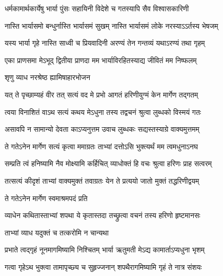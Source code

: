 \twolineshloka
{धर्मकामार्थकार्येषु भार्या पुंसः सहायिनी}
{विदेशे च गतस्यापि सैव विश्वासकारिणी}%

\twolineshloka
{नास्ति भार्यासमो बन्धुर्नास्ति भार्यासमं सुखम्}
{नास्ति भार्यासमं लोके नरस्याऽऽर्तस्य भेषजम्}%

\twolineshloka
{यस्य भार्या गृहे नास्ति साध्वी च प्रियवादिनी}
{अरण्यं तेन गन्तव्यं यथाऽरण्यं तथा गृहम्}%

\twolineshloka
{एका प्राणसमा मेऽभूद् द्वितीया प्राणदा मम}
{भार्याविरहितस्याद्य जीवितं मम निष्फलम्}%



\onelineshloka
{शृणु व्याध नरश्रेष्ठ ह्यामिषाहारभोजन}%

\twolineshloka
{यत् ते पृच्छाम्यहं वीर तत् सत्यं वद मे प्रभो}
{आगतं हरिणीयुग्मं केन मार्गेण तद्गतम्}%

\twolineshloka
{त्वया विनाशितं वाऽथ सत्यं कथय मेऽधुना}
{तस्य तद्वचनं श्रुत्वा लुब्धको विस्मयं गतः}%

\twolineshloka
{असावपि न सामान्यो देवता काऽप्यनुत्तम}
{उवाच लुब्धकः सद्यस्तस्याग्रे वाक्यमुत्तमम्}%


\twolineshloka
{ते गतेऽनेन मार्गेण सत्यं कृत्वा ममाग्रतः}
{ताभ्यां दत्तोऽसि भुक्त्यर्थं मम त्वमधुनाऽनघ}%

\twolineshloka
{सम्प्रति त्वं हनिष्यामि नैव मोक्ष्यामि कर्हिचित्}
{व्याधोक्तं हि वचः श्रुत्वा हरिणः प्राह सत्वरम्}%


\twolineshloka
{तत्सत्यं कीदृशं ताभ्यां वाक्यमुक्तं तवाग्रतः}
{येन ते प्रत्ययो जातो मुक्तं तद्धरिणीद्वयम्}%



\onelineshloka
{ते गतेऽनेन मार्गेण स्वमाश्रमपदं प्रति}%

\twolineshloka
{व्याधेन कथितास्ताभ्यां शपथा ये कृतास्तदा}
{तच्छ्रुत्वा वचनं तस्य हरिणो हृष्टमानसः}%



\onelineshloka
{ताभ्यां व्याध यदुक्तं च तत्करोमि न चान्यथा}%

\twolineshloka
{प्रभाते त्वद्गृहं नूनमागमिष्यामि निश्चितम्}
{भार्या ऋतुमती मेऽद्य कामार्ताऽप्यधुना भृशम्}%

\twolineshloka
{गत्वा गृहेऽथ भुक्त्वा तामापृच्छ्य च सुहृज्जनान्}
{शपथैरागमिष्यामि गृहं ते नात्र संशयः}%


